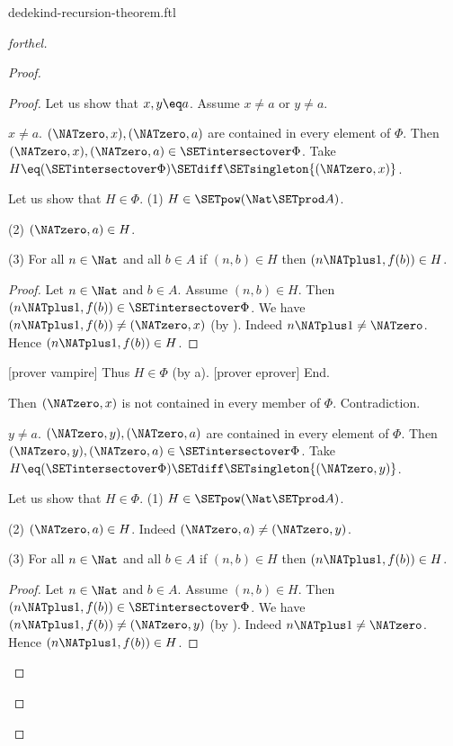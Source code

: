 \documentclass{naproche-library}
\begin{document}
\begin{smodule}[title=Dedekind's Recursion Theorem]{dedekind-recursion-theorem.ftl}
\begin{proof}[forthel]
\begin{proof}
\begin{proof}
        Let us show that $x, y \eq a$.
          Assume $x \neq a$ or $y \neq a$.

          \begin{case}{$x \neq a$.}
            $(\NATzero,x), (\NATzero,a)$ are contained in every element of $\Phi$.
            Then $(\NATzero,x), (\NATzero,a) \in \SETintersectover \Phi$.
            Take $H \eq (\SETintersectover \Phi) \SETdiff \SETsingleton{(\NATzero,x)}$.

            Let us show that $H \in \Phi$.
              (1) $H \in \SETpow(\Nat \SETprod A)$.

              (2) $(\NATzero,a) \in H$.

              (3) For all $n \in \Nat$ and all $b \in A$ if
              $(n,b) \in H$ then $(n \NATplus 1, f(b)) \in H$.
              \begin{proof}
                Let $n \in \Nat$ and $b \in A$.
                Assume $(n,b) \in H$.
                Then $(n \NATplus 1, f(b)) \in \SETintersectover \Phi$.
                We have $(n \NATplus 1, f(b)) \neq (\NATzero,x)$ (by ).
                Indeed $n \NATplus 1 \neq \NATzero$.
                Hence $(n \NATplus 1, f(b)) \in H$.
              \end{proof}

              [prover vampire]
              Thus $H \in \Phi$ (by a).
              [prover eprover]
            End.

            Then $(\NATzero,x)$ is not contained in every member of $\Phi$.
            Contradiction.
          \end{case}

          \begin{case}{$y \neq a$.}
            $(\NATzero,y), (\NATzero,a)$ are contained in every element of $\Phi$.
            Then $(\NATzero,y), (\NATzero,a) \in \SETintersectover \Phi$.
            Take $H \eq (\SETintersectover \Phi) \SETdiff \SETsingleton{(\NATzero,y)}$.

            Let us show that $H \in \Phi$.
              (1) $H \in \SETpow(\Nat \SETprod A)$.

              (2) $(\NATzero,a) \in H$.
              Indeed $(\NATzero,a) \neq (\NATzero,y)$.

              (3) For all $n \in \Nat$ and all $b \in A$ if
              $(n,b) \in H$ then $(n \NATplus 1, f(b)) \in H$.
              \begin{proof}
                Let $n \in \Nat$ and $b \in A$.
                Assume $(n,b) \in H$.
                Then $(n \NATplus 1, f(b)) \in \SETintersectover \Phi$.
                We have $(n \NATplus 1, f(b)) \neq (\NATzero,y)$ (by ).
                Indeed $n \NATplus 1 \neq \NATzero$.
                Hence $(n \NATplus 1, f(b)) \in H$.
              \end{proof}


\end{case}
\end{proof}
\end{proof}
\end{proof}
\end{smodule}
\end{document}
